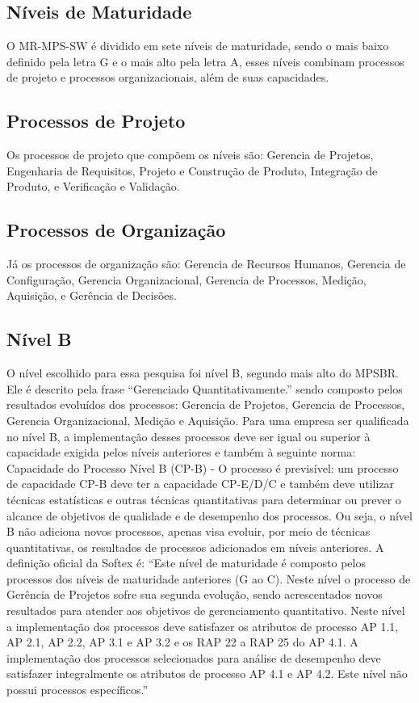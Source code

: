 \documentclass{article}
\begin{document}
\subsection{Níveis de Maturidade}
O MR-MPS-SW é dividido em sete níveis de maturidade, sendo o mais baixo definido pela letra G e o mais alto pela letra A, esses níveis combinam processos de projeto e processos organizacionais, além de suas capacidades.
\subsection{Processos de Projeto}
Os processos de projeto que compõem os níveis são: Gerencia de Projetos, Engenharia de Requisitos, Projeto e Construção de Produto, Integração de Produto, e Verificação e Validação.
\subsection{Processos de Organização}
Já os processos de organização são: Gerencia de Recursos Humanos, Gerencia de Configuração, Gerencia Organizacional, Gerencia de Processos, Medição, Aquisição, e Gerência de Decisões.
\subsection{Nível B}
O nível escolhido para essa pesquisa foi nível B, segundo mais alto do MPSBR. Ele é descrito pela frase “Gerenciado Quantitativamente.” sendo composto pelos resultados evoluídos dos processos: Gerencia de Projetos, Gerencia de Processos, Gerencia Organizacional, Medição e Aquisição. Para uma empresa ser qualificada no nível B, a implementação desses processos deve ser igual ou superior à capacidade exigida pelos níveis anteriores e também à seguinte norma: Capacidade do Processo Nível B (CP-B) - O processo é previsível: um processo de capacidade CP-B deve ter a capacidade CP-E/D/C e também deve utilizar técnicas estatísticas e outras técnicas quantitativas para determinar ou prever o alcance de objetivos de qualidade e de desempenho dos processos. Ou seja, o nível B não adiciona novos processos, apenas visa evoluir, por meio de técnicas quantitativas, os resultados de processos adicionados em níveis anteriores. A definição oficial da Softex é: “Este nível de maturidade é composto pelos processos dos níveis de maturidade anteriores (G ao C). Neste nível o processo de Gerência de Projetos sofre sua segunda evolução, sendo acrescentados novos resultados para atender aos objetivos de gerenciamento quantitativo. Neste nível a implementação dos processos deve satisfazer os atributos de processo AP 1.1, AP 2.1, AP 2.2, AP 3.1 e AP 3.2 e os RAP 22 a RAP 25 do AP 4.1. A implementação dos processos selecionados para análise de desempenho deve satisfazer integralmente os atributos de processo AP 4.1 e AP 4.2. Este nível não possui processos específicos.”
\end{document}
